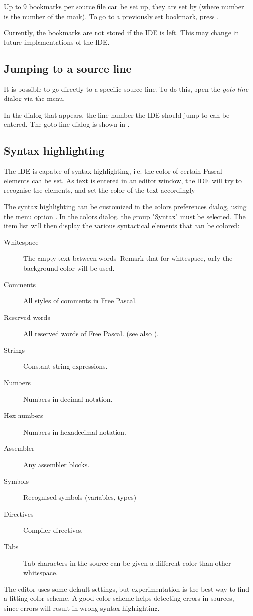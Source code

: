 Up to 9 bookmarks per source file can be set up, they are set by
 (where number is the number of the mark).
To go to a previously set bookmark, press .

\begin{remark}
Currently, the bookmarks are not stored if the IDE is left. This may
change in future implementations of the IDE.
\end{remark}

%
%
\subsection{Jumping to a source line}
It is possible to go directly to a specific source line. To do this, open
the {\em goto line} dialog via the  menu.

In the dialog that appears, the line-number the IDE should jump to can be
entered. The goto line dialog is shown in .


%
%
\subsection{Syntax highlighting}
\label{se:syntaxhighlighting}
The IDE is capable of syntax highlighting, i.e. the color of certain
Pascal elements can be set. As text is entered in an editor window,
the IDE will try to recognise the elements, and set the color of the
text accordingly.


The syntax highlighting can be customized in the colors preferences dialog,
using the menu option . In the colors dialog, the
group "Syntax" must be selected. The item list will then display the
various syntactical elements that can be colored:
\begin{description}
\item[Whitespace] The empty text between words. Remark that for whitespace,
only the background color will be used.
\item[Comments] All styles of comments in Free Pascal.
\item[Reserved words] All reserved words of Free Pascal. (see also ).
\item[Strings] Constant string expressions.
\item[Numbers] Numbers in decimal notation.
\item[Hex numbers] Numbers in hexadecimal notation.
\item[Assembler] Any assembler blocks.
\item[Symbols] Recognised symbols (variables, types)
\item[Directives] Compiler directives.
\item[Tabs] Tab characters in the source can be given a different color than
other whitespace.
\end{description}
The editor uses some default settings, but experimentation is the best way
to find a fitting color scheme. A good color scheme helps detecting errors
in sources, since errors will result in wrong syntax highlighting.

